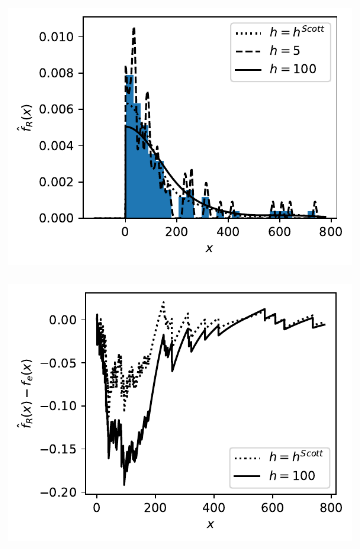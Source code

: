 \documentclass[../Thesis.tex]{subfiles}
\begin{document}
\begin{figure}[h]
    \centering
    \begin{subfigure}[t]{0.49\linewidth}
        \centering
        \includegraphics[width = \linewidth]{figures/MI estimation/suicide data example - reflection.pdf}
        \caption{}
        \label{fig:suicide KDE example - reflected}
    \end{subfigure}
    \hfill
    \begin{subfigure}[t]{0.49\linewidth}
        \centering
        \includegraphics[width = \linewidth]{figures/MI estimation/suicide data example - reflection - Kolmogorov Smirnov.pdf}
        \caption{}
        \label{fig:Kolmogorov Smirnov DN}
    \end{subfigure}
    \caption{}
\end{figure}
\end{document}
